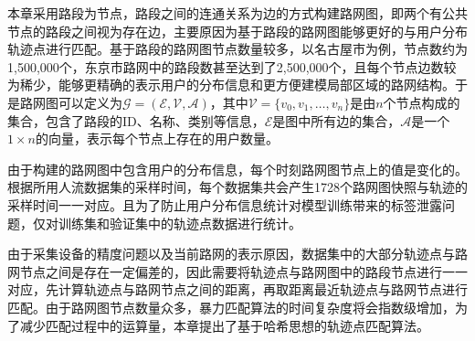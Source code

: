 \documentclass[master]{thesis-uestc}
\begin{document}
本章采用路段为节点，路段之间的连通关系为边的方式构建路网图，即两个有公共节点的路段之间视为存在边，主要原因为基于路段的路网图能够更好的与用户分布轨迹点进行匹配。基于路段的路网图节点数量较多，以名古屋市为例，节点数约为1,500,000个，东京市路网中的路段数甚至达到了2,500,000个，且每个节点边数较为稀少，能够更精确的表示用户的分布信息和更方便建模局部区域的路网结构。于是路网图可以定义为$\mathcal{G}=(\mathcal{E},\mathcal{V},\mathcal{A})$，其中$\mathcal{V}=\{v_0,v_1,\dots,v_n\}$是由$n$个节点构成的集合，包含了路段的ID、名称、类别等信息，$\mathcal{E}$是图中所有边的集合，$\mathcal{A}$是一个$1\times n$的向量，表示每个节点上存在的用户数量。

由于构建的路网图中包含用户的分布信息，每个时刻路网图节点上的值是变化的。根据所用人流数据集的采样时间，每个数据集共会产生1728个路网图快照与轨迹的采样时间一一对应。且为了防止用户分布信息统计对模型训练带来的标签泄露问题，仅对训练集和验证集中的轨迹点数据进行统计。

由于采集设备的精度问题以及当前路网的表示原因，数据集中的大部分轨迹点与路网节点之间是存在一定偏差的，因此需要将轨迹点与路网图中的路段节点进行一一对应，先计算轨迹点与路网节点之间的距离，再取距离最近轨迹点与路网节点进行匹配。由于路网图节点数量众多，暴力匹配算法的时间复杂度将会指数级增加，为了减少匹配过程中的运算量，本章提出了基于哈希思想的轨迹点匹配算法。
\end{document}
